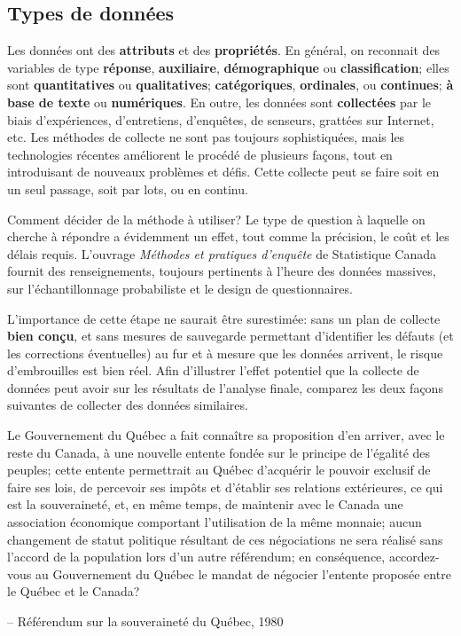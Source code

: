 \subsection{Types de données} 
Les données ont des \textbf{attributs} et des \textbf{propriétés}. En général, on reconnait des variables de type \textbf{réponse}, \textbf{auxiliaire}, \textbf{démographique} ou \textbf{classification}; elles sont \textbf{quantitatives} ou \textbf{qualitatives}; \textbf{catégoriques}, \textbf{ordinales}, ou \textbf{continues}; \textbf{à base de texte} ou \textbf{numériques}. En outre, les données sont \textbf{collectées} par le biais d'expériences, d'entretiens, d'enquêtes, de senseurs, grattées sur Internet, etc. 
\newl Les méthodes de collecte ne sont pas toujours sophistiquées, mais les technologies récentes améliorent  le procédé de plusieurs façons, tout en introduisant de nouveaux problèmes et défis. Cette collecte peut se faire soit en un seul passage, soit par lots, ou en continu.
\par Comment décider de la méthode à utiliser? Le type de question à laquelle on cherche à répondre a évidemment un effet, tout comme la précision, le coût et les délais requis. L'ouvrage \textit{Méthodes et pratiques d'enquête} de Statistique Canada \cite{DC_SC} fournit des renseignements, toujours pertinents à l'heure des données massives, sur l'échantillonnage probabiliste et le design de questionnaires. \par L'importance de cette étape ne saurait être surestimée: sans un plan de collecte \textbf{bien conçu}, et sans mesures de sauvegarde permettant d'identifier les défauts (et les corrections éventuelles) au fur et à mesure que les données arrivent, le risque d’embrouilles est bien réel. \newl
Afin d'illustrer l'effet potentiel que la collecte de données peut avoir sur les résultats de l'analyse finale, comparez les deux façons suivantes de collecter des données similaires.
\begin{tcolorbox}[title=Oui. Au fait ... non. Me semble.]
Le Gouvernement du Québec a fait connaître sa proposition d’en arriver, avec le reste du Canada, à une nouvelle entente fondée sur le principe de l’égalité des peuples; cette entente permettrait au Québec d'acquérir le pouvoir exclusif de faire ses lois, de percevoir ses impôts et d’établir ses relations extérieures, ce qui est la souveraineté, et, en même temps, de maintenir avec le Canada une association économique comportant l’utilisation de la même monnaie; aucun changement de statut politique résultant de ces négociations ne sera réalisé sans l’accord de la population lors d’un autre référendum; en conséquence, accordez-vous au Gouvernement du Québec le mandat de négocier l’entente proposée entre le Québec et le Canada? \\[-0.6cm]
\begin{flushright}
-- R\'ef\'erendum sur la souverainet\'e du Qu\'ebec, 1980
\end{flushright}
\end{tcolorbox}
